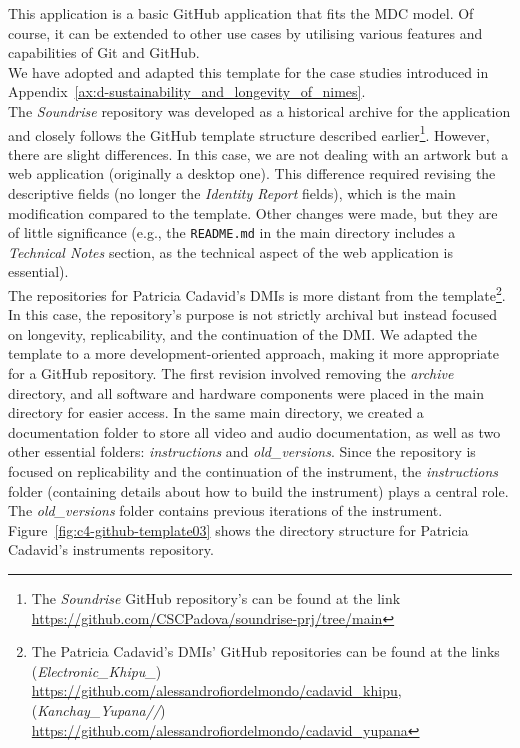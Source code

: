 \newline
This application is a basic GitHub application that fits the MDC model. Of course, it can be extended to other use cases by utilising various features and capabilities of Git and GitHub.\\
We have adopted and adapted this template for the case studies introduced in Appendix~\ref{ax:d-sustainability_and_longevity_of_nimes}.\\
The \textit{Soundrise} repository was developed as a historical archive for the application and closely follows the GitHub template structure described earlier\footnote{The \textit{Soundrise} GitHub repository's can be found at the link \url{https://github.com/CSCPadova/soundrise-prj/tree/main}}. However, there are slight differences. In this case, we are not dealing with an artwork but a web application (originally a desktop one). This difference required revising the descriptive fields (no longer the \textit{Identity Report} fields), which is the main modification compared to the template. Other changes were made, but they are of little significance (e.g., the \texttt{README.md} in the main directory includes a \textit{Technical Notes} section, as the technical aspect of the web application is essential).\\
The repositories for Patricia Cadavid’s DMIs is more distant from the template\footnote{The Patricia Cadavid's DMIs' GitHub repositories can be found at the links (\textit{Electronic\_Khipu\_}) \url{https://github.com/alessandrofiordelmondo/cadavid_khipu}, (\textit{Kanchay\_Yupana//}) \url{https://github.com/alessandrofiordelmondo/cadavid_yupana}}. In this case, the repository’s purpose is not strictly archival but instead focused on longevity, replicability, and the continuation of the DMI. We adapted the template to a more development-oriented approach, making it more appropriate for a GitHub repository. The first revision involved removing the \textit{archive} directory, and all software and hardware components were placed in the main directory for easier access. In the same main directory, we created a documentation folder to store all video and audio documentation, as well as two other essential folders: \textit{instructions} and \textit{old\_versions}. Since the repository is focused on replicability and the continuation of the instrument, the \textit{instructions} folder (containing details about how to build the instrument) plays a central role. The \textit{old\_versions} folder contains previous iterations of the instrument. Figure~\ref{fig:c4-github-template03} shows the directory structure for Patricia Cadavid’s instruments repository.

